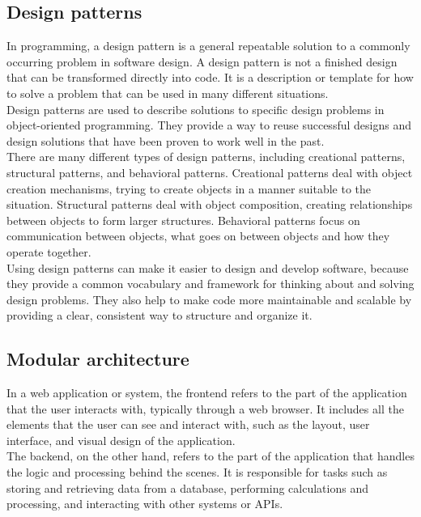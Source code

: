 \documentclass[11pt]{article}
\begin{document}
\subsection*{Design patterns}
\label{ap:design_patterns}
In programming, a design pattern is a general repeatable solution to a commonly occurring problem in software design. 
A design pattern is not a finished design that can be transformed directly into code. 
It is a description or template for how to solve a problem that can be used in many different situations.\\

Design patterns are used to describe solutions to specific design problems in object-oriented programming. 
They provide a way to reuse successful designs and design solutions that have been proven to work well in the past.\\

There are many different types of design patterns, including creational patterns, structural patterns, and behavioral patterns. 
Creational patterns deal with object creation mechanisms, trying to create objects in a manner suitable to the situation. 
Structural patterns deal with object composition, creating relationships between objects to form larger structures. 
Behavioral patterns focus on communication between objects, what goes on between objects and how they operate together.\\

Using design patterns can make it easier to design and develop software, because they provide a common vocabulary and framework for thinking about and solving design problems. 
They also help to make code more maintainable and scalable by providing a clear, consistent way to structure and organize it.\\

\subsection*{Modular architecture}
\label{ap:modular_architecture}
In a web application or system, the frontend refers to the part of the application that the user interacts with, typically through a web browser. 
It includes all the elements that the user can see and interact with, such as the layout, user interface, and visual design of the application.\\

The backend, on the other hand, refers to the part of the application that handles the logic and processing behind the scenes. 
It is responsible for tasks such as storing and retrieving data from a database, performing calculations and processing, and interacting with other systems or APIs.\\
\end{document}
